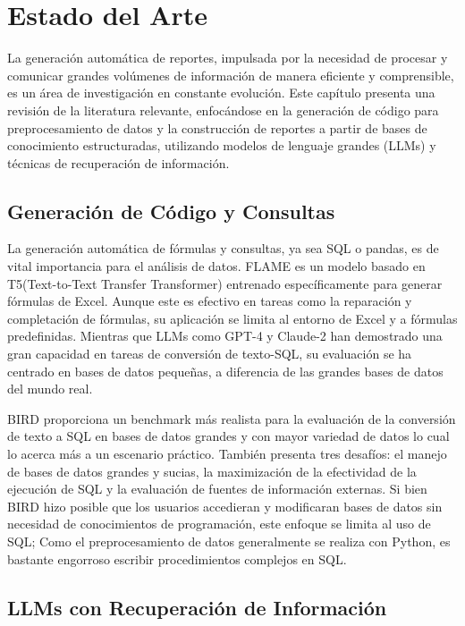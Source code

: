 \chapter{Estado del Arte}\label{chapter:state-of-the-art}

La generación automática de reportes, impulsada por la necesidad de procesar y comunicar grandes volúmenes de información de manera eficiente y comprensible, es un área de investigación en constante evolución. Este capítulo presenta una revisión de la literatura relevante, enfocándose en la generación de código para preprocesamiento de datos y la construcción de reportes a partir de bases de conocimiento estructuradas, utilizando modelos de lenguaje grandes (LLMs) y técnicas de recuperación de información.

\section{Generación de Código y Consultas}

La generación automática de fórmulas y consultas, ya sea SQL o pandas, es de vital importancia para el análisis de datos. FLAME \cite{joshi2024flame} es un modelo basado en T5(Text-to-Text Transfer Transformer)\cite{raffel2020exploring} entrenado específicamente para generar fórmulas de Excel. Aunque este es efectivo en tareas como la reparación y completación de fórmulas, su aplicación se limita al entorno de Excel y a fórmulas predefinidas. Mientras que LLMs como GPT-4 y Claude-2 han demostrado una gran capacidad en tareas de conversión de texto-SQL, su evaluación se ha centrado en bases de datos pequeñas, a diferencia de las grandes bases de datos del mundo real.

BIRD \cite{li2024can} proporciona un benchmark más realista para la evaluación de la conversión de texto a SQL en bases de datos grandes y con mayor variedad de datos lo cual lo acerca más a un escenario práctico. También presenta tres desafíos: el manejo de bases de datos grandes y sucias, la maximización de la efectividad de la ejecución de SQL y la evaluación de fuentes de información externas. Si bien BIRD hizo posible que los usuarios accedieran y modificaran bases de datos sin necesidad de conocimientos de programación, este enfoque se limita al uso de SQL; Como el preprocesamiento de datos generalmente se realiza con Python, es bastante engorroso escribir procedimientos complejos en SQL.

\section{LLMs con Recuperación de Información}

